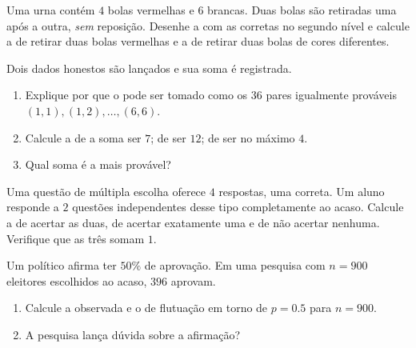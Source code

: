 \begin{exercise}[$\star\star$]\label{exo:g10:proba:5}
Uma urna contém $4$ bolas vermelhas e $6$ brancas. Duas bolas são
retiradas uma após a outra, \emph{sem} reposição. Desenhe a  com as
 corretas no segundo nível e calcule a  de
retirar duas bolas vermelhas e a de retirar duas bolas de cores
diferentes.
\end{exercise}

\begin{exercise}[$\star\star$]\label{exo:g10:proba:6}
Dois dados honestos são lançados e sua soma é registrada.
\begin{enumerate}
  \item Explique por que o  pode ser tomado como os $36$
        pares igualmente prováveis $(1,1), (1,2), \dots, (6,6)$.
  \item Calcule a  de a soma ser $7$; de ser $12$; de ser no
        máximo $4$.
  \item Qual soma é a mais provável?
\end{enumerate}
\end{exercise}

\begin{exercise}[$\star\star$]\label{exo:g10:proba:7}
Uma questão de múltipla escolha oferece $4$ respostas, uma correta. Um
aluno responde a $2$ questões independentes desse tipo completamente ao
acaso. Calcule a  de acertar as duas, de acertar exatamente
uma e de não acertar nenhuma. Verifique que as três  somam
$1$.
\end{exercise}

\begin{exercise}[$\star\star$]\label{exo:g10:proba:8}
Um político afirma ter $50\%$ de aprovação. Em uma pesquisa com $n = 900$
eleitores escolhidos ao acaso, $396$ aprovam.
\begin{enumerate}
  \item Calcule a  observada e o  de flutuação em
        torno de $p = 0.5$ para $n = 900$.
  \item A pesquisa lança dúvida sobre a afirmação?
\end{enumerate}
\end{exercise}

